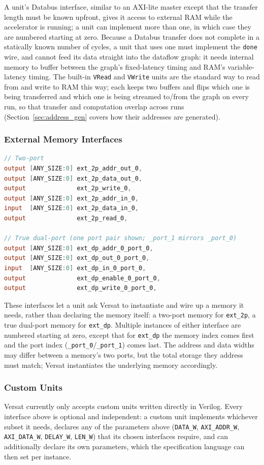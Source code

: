 A unit's Databus interface, similar to an AXI-lite master except that the
transfer length must be known upfront, gives it access to external RAM
while the accelerator is running; a unit can implement more than one, in
which case they are numbered starting at zero. Because a Databus transfer
does not complete in a statically known number of cycles, a unit that uses
one must implement the \texttt{done} wire, and cannot feed its data
straight into the dataflow graph: it needs internal memory to buffer
between the graph's fixed-latency timing and RAM's variable-latency
timing. The built-in \texttt{VRead} and \texttt{VWrite} units are the
standard way to read from and write to RAM this way; each keeps two
buffers and flips which one is being transferred and which one is being
streamed to/from the graph on every run, so that transfer and computation
overlap across runs (Section~\ref{sec:address_gen} covers how their
addresses are generated).

\subsubsection*{External Memory Interfaces}

\begin{lstlisting}[language=Verilog,caption={External Memory interfaces: two-port and true dual-port.},label={lst:if_ext_mem}]
// Two-port
output [ANY_SIZE:0] ext_2p_addr_out_0,
output [ANY_SIZE:0] ext_2p_data_out_0,
output              ext_2p_write_0,
output [ANY_SIZE:0] ext_2p_addr_in_0,
input  [ANY_SIZE:0] ext_2p_data_in_0,
output              ext_2p_read_0,

// True dual-port (one port pair shown; _port_1 mirrors _port_0)
output [ANY_SIZE:0] ext_dp_addr_0_port_0,
output [ANY_SIZE:0] ext_dp_out_0_port_0,
input  [ANY_SIZE:0] ext_dp_in_0_port_0,
output              ext_dp_enable_0_port_0,
output              ext_dp_write_0_port_0,
\end{lstlisting}

These interfaces let a unit ask Versat to instantiate and wire up a memory
it needs, rather than declaring the memory itself: a two-port memory for
\texttt{ext\_2p}, a true dual-port memory for \texttt{ext\_dp}. Multiple
instances of either interface are numbered starting at zero, except that
for \texttt{ext\_dp} the memory index comes first and the port index
(\texttt{\_port\_0}/\texttt{\_port\_1}) comes last. The address and data
widths may differ between a memory's two ports, but the total storage they
address must match; Versat instantiates the underlying memory accordingly.

\subsubsection*{Custom Units}

Versat currently only accepts custom units written directly in Verilog.
Every interface above is optional and independent: a custom unit
implements whichever subset it needs, declares any of the parameters above
(\texttt{DATA\_W}, \texttt{AXI\_ADDR\_W}, \texttt{AXI\_DATA\_W},
\texttt{DELAY\_W}, \texttt{LEN\_W}) that its chosen interfaces require, and
can additionally declare its own parameters, which the specification
language can then set per instance.
